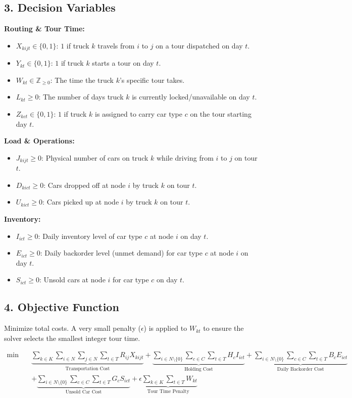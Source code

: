 \documentclass{article}
\begin{document}
\subsection*{3. Decision Variables}
\textbf{Routing \& Tour Time:}
\begin{itemize}
    \item $X_{kijt} \in \{0, 1\}$: $1$ if truck $k$ travels from $i$ to $j$ on a tour dispatched on day $t$.
    \item $Y_{kt} \in \{0, 1\}$: $1$ if truck $k$ starts a tour on day $t$.
    \item $W_{kt} \in \mathbb{Z}_{\ge 0}$: The time the truck $k$'s specific tour takes.
    \item $L_{kt} \ge 0$: The number of days truck $k$ is currently locked/unavailable on day $t$.
    \item $Z_{kct} \in \{0, 1\}$: $1$ if truck $k$ is assigned to carry car type $c$ on the tour starting day $t$.
\end{itemize}

\textbf{Load \& Operations:}
\begin{itemize}
    \item $J_{kijt} \ge 0$: Physical number of cars on truck $k$ while driving from $i$ to $j$ on tour $t$.
    \item $D_{kict} \ge 0$: Cars dropped off at node $i$ by truck $k$ on tour $t$.
    \item $U_{kict} \ge 0$: Cars picked up at node $i$ by truck $k$ on tour $t$.
\end{itemize}

\textbf{Inventory:}
\begin{itemize}
    \item $I_{ict} \ge 0$: Daily inventory level of car type $c$ at node $i$ on day $t$.
    \item $E_{ict} \ge 0$: Daily backorder level (unmet demand) for car type $c$ at node $i$ on day $t$.
    \item $S_{ict} \ge 0$: Unsold cars at node $i$ for car type $c$ on day $t$.
\end{itemize}

\subsection*{4. Objective Function}
Minimize total costs. A very small penalty ($\epsilon$) is applied to $W_{kt}$ to ensure the solver selects the smallest integer tour time.

\begin{align}
\min \quad & \underbrace{\sum_{k \in K} \sum_{i \in N} \sum_{j \in N} \sum_{t \in T} R_{ij} X_{kijt}}_{\text{Transportation Cost}} + \underbrace{\sum_{i \in N \setminus \{0\}} \sum_{c \in C} \sum_{t \in T} H_c I_{ict}}_{\text{Holding Cost}} + \underbrace{\sum_{i \in N \setminus \{0\}} \sum_{c \in C} \sum_{t \in T} B_c E_{ict}}_{\text{Daily Backorder Cost}} \nonumber \\
& + \underbrace{\sum_{i \in N \setminus \{0\}} \sum_{c \in C} \sum_{t \in T} G_c S_{ict}}_{\text{Unsold Car Cost}} + \underbrace{\epsilon \sum_{k \in K} \sum_{t \in T} W_{kt}}_{\text{Tour Time Penalty}}
\end{align}
\end{document}
